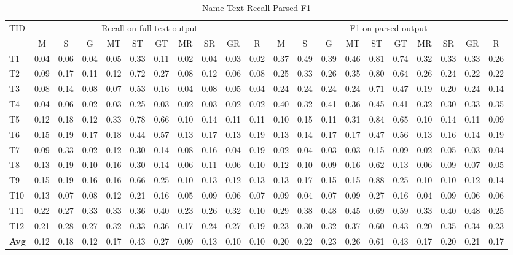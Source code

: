 \begin{table}
\caption{Name Text Recall Parsed F1}
\label{tab:name_text_recall_parsed_f1}
\begin{tabular}{l|cccccccccc|cccccccccc}
\hline
\multirow{2}{*}{TID} & \multicolumn{10}{|c|}{Recall on full text output} & \multicolumn{10}{c}{F1 on parsed output} \\
\cline{2-21}
\multicolumn{1}{l|}{} & M & S & G & MT & ST & GT & MR & SR & GR & R & M & S & G & MT & ST & GT & MR & SR & GR & R \\
\hline
T1 & 0.04 & 0.06 & 0.04 & 0.05 & 0.33 & 0.11 & 0.02 & 0.04 & 0.03 & 0.02 & 0.37 & 0.49 & 0.39 & 0.46 & 0.81 & 0.74 & 0.32 & 0.33 & 0.33 & 0.26 \\
T2 & 0.09 & 0.17 & 0.11 & 0.12 & 0.72 & 0.27 & 0.08 & 0.12 & 0.06 & 0.08 & 0.25 & 0.33 & 0.26 & 0.35 & 0.80 & 0.64 & 0.26 & 0.24 & 0.22 & 0.22 \\
T3 & 0.08 & 0.14 & 0.08 & 0.07 & 0.53 & 0.16 & 0.04 & 0.08 & 0.05 & 0.04 & 0.24 & 0.24 & 0.24 & 0.24 & 0.71 & 0.47 & 0.19 & 0.20 & 0.24 & 0.14 \\
T4 & 0.04 & 0.06 & 0.02 & 0.03 & 0.25 & 0.03 & 0.02 & 0.03 & 0.02 & 0.02 & 0.40 & 0.32 & 0.41 & 0.36 & 0.45 & 0.41 & 0.32 & 0.30 & 0.33 & 0.35 \\
T5 & 0.12 & 0.18 & 0.12 & 0.33 & 0.78 & 0.66 & 0.10 & 0.14 & 0.11 & 0.11 & 0.10 & 0.15 & 0.11 & 0.31 & 0.84 & 0.65 & 0.10 & 0.14 & 0.11 & 0.09 \\
T6 & 0.15 & 0.19 & 0.17 & 0.18 & 0.44 & 0.57 & 0.13 & 0.17 & 0.13 & 0.19 & 0.13 & 0.14 & 0.17 & 0.17 & 0.47 & 0.56 & 0.13 & 0.16 & 0.14 & 0.19 \\
T7 & 0.09 & 0.33 & 0.02 & 0.12 & 0.30 & 0.14 & 0.08 & 0.16 & 0.04 & 0.19 & 0.02 & 0.04 & 0.03 & 0.03 & 0.15 & 0.09 & 0.02 & 0.05 & 0.03 & 0.04 \\
T8 & 0.13 & 0.19 & 0.10 & 0.16 & 0.30 & 0.14 & 0.06 & 0.11 & 0.06 & 0.10 & 0.12 & 0.10 & 0.09 & 0.16 & 0.62 & 0.13 & 0.06 & 0.09 & 0.07 & 0.05 \\
T9 & 0.15 & 0.19 & 0.16 & 0.16 & 0.66 & 0.25 & 0.10 & 0.13 & 0.12 & 0.13 & 0.13 & 0.17 & 0.15 & 0.15 & 0.88 & 0.25 & 0.10 & 0.10 & 0.12 & 0.14 \\
T10 & 0.13 & 0.07 & 0.08 & 0.12 & 0.21 & 0.16 & 0.05 & 0.09 & 0.06 & 0.07 & 0.09 & 0.04 & 0.07 & 0.09 & 0.27 & 0.16 & 0.04 & 0.09 & 0.06 & 0.06 \\
T11 & 0.22 & 0.27 & 0.33 & 0.33 & 0.36 & 0.40 & 0.23 & 0.26 & 0.32 & 0.10 & 0.29 & 0.38 & 0.48 & 0.45 & 0.69 & 0.59 & 0.33 & 0.40 & 0.48 & 0.25 \\
T12 & 0.21 & 0.28 & 0.27 & 0.32 & 0.33 & 0.36 & 0.17 & 0.24 & 0.27 & 0.19 & 0.23 & 0.30 & 0.32 & 0.37 & 0.60 & 0.43 & 0.20 & 0.35 & 0.34 & 0.23 \\
\hline
\textbf{Avg} & 0.12 & 0.18 & 0.12 & 0.17 & 0.43 & 0.27 & 0.09 & 0.13 & 0.10 & 0.10 & 0.20 & 0.22 & 0.23 & 0.26 & 0.61 & 0.43 & 0.17 & 0.20 & 0.21 & 0.17 \\
\hline
\end{tabular}
\end{table}
